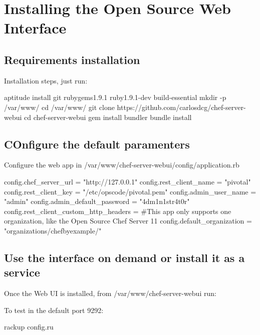 \section{Installing the Open Source Web Interface}

\subsection{Requirements installation}

Installation steps, just run:
\begin{codelisting}
\label{code:}
\codecaption{}
\begin{code}
aptitude install git rubygems1.9.1 ruby1.9.1-dev build-essential
mkdir -p /var/www/
cd /var/www/
git clone https://github.com/carlosdcg/chef-server-webui
cd chef-server-webui
gem install bundler
bundle install
\end{code}
\end{codelisting}

\subsection{COnfigure the default paramenters}

Configure the web app in /var/www/chef-server-webui/config/application.rb

\begin{codelisting}
\label{code:}
\codecaption{}
\begin{code}
config.chef_server_url = "http://127.0.0.1"
config.rest_client_name = "pivotal"
config.rest_client_key = "/etc/opscode/pivotal.pem"
config.admin_user_name =  "admin"
config.admin_default_password = "4dm1n1str4t0r"
config.rest_client_custom_http_headers = {}
#This app only supports one organization, like the Open Source Chef Server 11
config.default_organization = "organizations/chefbyexample/"
\end{code}
\end{codelisting}

\subsection{Use the interface on demand or install it as a service}

Once the Web UI is installed, from /var/www/chef-server-webui run:

To test in the default port 9292:
\begin{codelisting}
\label{code:}
\codecaption{}
\begin{code}
rackup config.ru
\end{code}
\end{codelisting}

